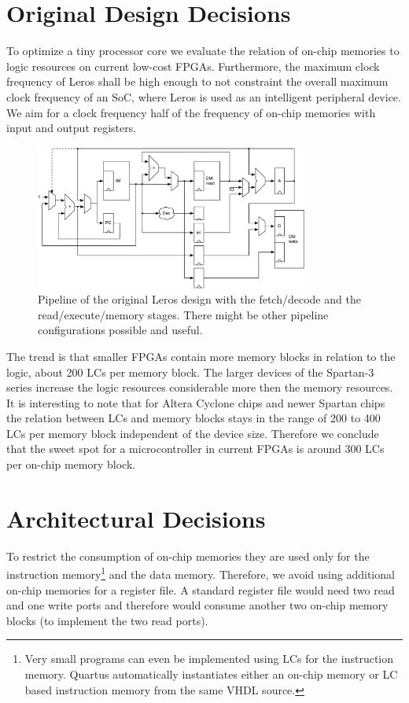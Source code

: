 \documentclass[a4paper,fontsize=10pt,twoside,DIV15,BCOR12mm,headinclude=true,footinclude=false,pagesize,bibtotoc]{scrbook}
\begin{document}
\section{Original Design Decisions}

To optimize a tiny processor core we evaluate the relation of on-chip memories to logic resources on current low-cost FPGAs. Furthermore, the maximum clock frequency of Leros shall be high enough to not constraint the overall maximum clock frequency of an SoC, where Leros is used as an intelligent peripheral device. We aim for a clock frequency half of the frequency of on-chip memories with input and output registers.


\begin{figure}[t]
    \centering
    \includegraphics[width=0.8\textwidth]{fig/pipeline}
    \caption{Pipeline of the original Leros design with the fetch/decode and the read/execute/memory stages.
    There might be other pipeline configurations possible and useful.}\label{fig:pipeline}
\end{figure}

The trend is that smaller FPGAs contain more  memory blocks in relation to the logic, about 200 LCs per memory block.
The larger devices of the Spartan-3 series increase the logic resources considerable more then the memory resources.
It is interesting to note that for Altera Cyclone chips and newer Spartan chips the relation between LCs and memory blocks stays in the range of 200 to 400 LCs per memory block independent of the device size.
Therefore we conclude that the sweet spot for a microcontroller in current FPGAs is around 300 LCs per on-chip memory block.



\section{Architectural Decisions}

To restrict the consumption of on-chip memories they are used only for the instruction memory\footnote{Very small programs can even be implemented using LCs for the instruction memory. Quartus automatically instantiates either an on-chip memory or LC based instruction memory from the same VHDL source.} and the data memory. Therefore, we avoid using additional on-chip memories for a register file. A standard register file would need two read and one write ports and therefore would consume another two on-chip memory blocks (to implement the two read ports).
\end{document}
